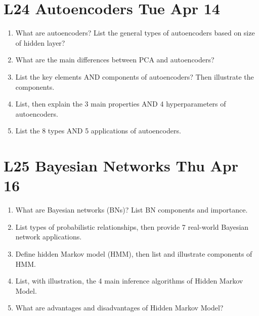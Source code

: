 \documentclass[12pt]{article}
\newenvironment{QandA}{\begin{enumerate}[label=\bfseries\arabic*.]\bfseries}
{\end{enumerate}}
\begin{document}
\section*{L24 Autoencoders \textemdash{} Tue Apr 14}
\begin{QandA}
    \item What are autoencoders? List the general types of autoencoders based on size of hidden layer?
    \item What are the main differences between PCA and autoencoders?
    \item List the key elements AND components of autoencoders? Then illustrate the components.
    \item List, then explain the 3 main properties AND 4 hyperparameters of autoencoders.
    \item List the 8 types AND 5 applications of autoencoders.
\end{QandA}

\section*{L25 Bayesian Networks \textemdash{} Thu Apr 16}
\begin{QandA}
    \item What are Bayesian networks (BNs)? List BN components and importance.
    \item List types of probabilistic relationships, then provide 7 real-world Bayesian network applications.
    \item Define hidden Markov model (HMM), then list and illustrate components of HMM.
    \item List, with illustration, the 4 main inference algorithms of Hidden Markov Model.
    \item What are advantages and disadvantages of Hidden Markov Model?
\end{QandA}
\end{document}
